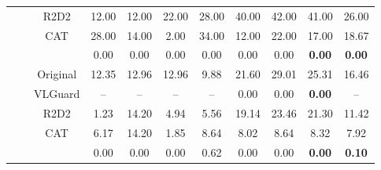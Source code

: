 \begin{table*}[t]
{\begin{tabular}{c|c|c|cc|cc|cc||cc}
    && R2D2 &12.00 &12.00  &22.00&28.00  &40.00 & 42.00& 41.00&26.00 \\
    && CAT &28.00 &14.00  &2.00& 34.00  &12.00 & 22.00&17.00&18.67  \\
    &&  &0.00 &0.00 &0.00& 0.00  &0.00 &0.00 &	\textbf{0.00}&\textbf{0.00}	
    \\
    & & {Original}&12.35&12.96&12.96&9.88&21.60&29.01&25.31&16.46 \\
    && VLGuard&-- &--  &--&--   &0.00&0.00&\textbf{0.00}&--  \\
    
    && R2D2 &1.23&14.20&4.94&5.56&19.14&23.46&21.30&11.42 \\
    && CAT &6.17&14.20&1.85&8.64&8.02&8.64&8.32&7.92  \\ 
    &&  &0.00&0.00&0.00&0.62&0.00&0.00&\textbf{0.00}&\textbf{0.10}	
    \\
    \bottomrule
    
\end{tabular}
    }
    \vspace{-0.15in}
\end{table*}

